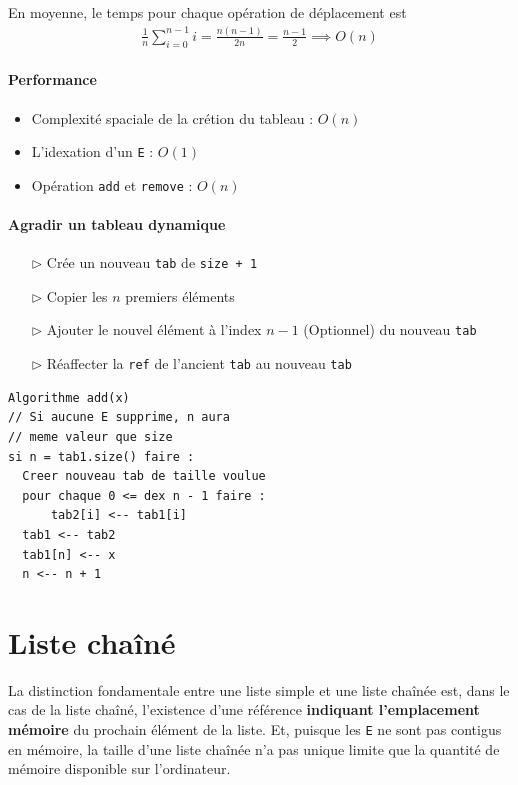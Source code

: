 \documentclass{report}
\begin{document}
\begin{multicols*}{3}
  En moyenne, le temps pour chaque opération de déplacement est 
  \begin{align*}
      \frac{1}{n}\sum_{i=0}^{n -1}i = \frac{n(n-1)}{2n} = \frac{n-1}{2} \implies O(n)   
  \end{align*}

  \paragraph{Performance}
  \begin{itemize}
    \item Complexité spaciale de la crétion du tableau : $O(n)$ 
    \item L'idexation d'un \texttt{E} : $O(1)$ 
    \item Opération \textcolor{myb}{\texttt{add}} et 
      \textcolor{myb}{\texttt{remove}} : $O(n)$  
  \end{itemize}

  \paragraph{Agradir un tableau dynamique}
  \begin{itemize}
    \item [$\rhd$ ] Crée un nouveau \texttt{tab} de \texttt{size + 1}    
    \item [$\rhd$ ] Copier les $n$ premiers éléments 
    \item [$\rhd$ ] Ajouter le nouvel élément à l'index $n -1$ 
      (Optionnel)
      du nouveau \texttt{tab}  
    \item [$\rhd$ ] Réaffecter la \texttt{ref} de 
      l'ancient \texttt{tab}   au nouveau \texttt{tab}  
  \end{itemize}

  \begin{lstlisting} 
Algorithme add(x)
// Si aucune E supprime, n aura 
// meme valeur que size
si n = tab1.size() faire :
  Creer nouveau tab de taille voulue 
  pour chaque 0 <= dex n - 1 faire : 
      tab2[i] <-- tab1[i]
  tab1 <-- tab2 
  tab1[n] <-- x
  n <-- n + 1
  \end{lstlisting}


  \section{Liste chaîné}
  La distinction fondamentale entre une liste simple et une liste chaînée 
  est, dans le cas de la liste chaîné, l'existence d'une référence 
  \textbf{indiquant l'emplacement mémoire} du prochain élément de la 
  liste. Et, puisque les \texttt{E} ne sont pas contigus en mémoire, la taille 
  d'une liste chaînée n'a pas unique limite que la quantité 
  de mémoire disponible sur l'ordinateur. 


\end{multicols*}
\end{document}
